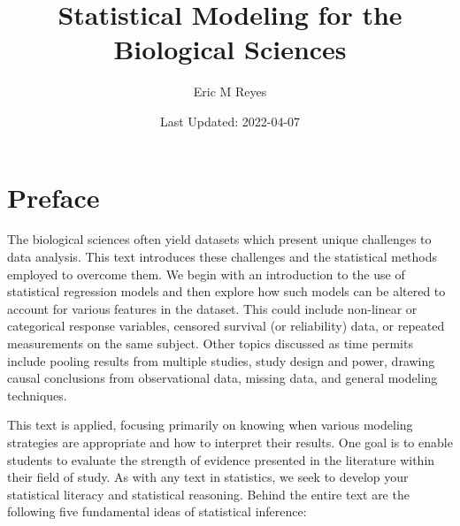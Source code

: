 \documentclass[
]{book}
\title{Statistical Modeling for the Biological Sciences}
\author{Eric M Reyes}
\date{Last Updated: 2022-04-07}
\theoremstyle{plain}
\theoremstyle{mydefn}
\theoremstyle{myexmpl}
\theoremstyle{remark}
\begin{document}
\maketitle

{
\setcounter{tocdepth}{1}
\tableofcontents
}
\newcommand{\norm}[1]{\lVert#1\rVert}
\newcommand{\abs}[1]{\lvert#1\rvert}
\newcommand{\iid}{\stackrel{\text{IID}}{\sim}}
\newcommand{\ind}{\stackrel{\text{Ind}}{\sim}}

\newcommand{\bm}[1]{\mathbf{#1}}
\newcommand{\bs}[1]{\boldsymbol{#1}}
\newcommand{\bbeta}{\bs{\beta}}

\newcommand{\Ell}{\mathcal{L}}

\hypertarget{preface}{%
\chapter*{Preface}\label{preface}}

The biological sciences often yield datasets which present unique challenges to data analysis. This text introduces these challenges and the statistical methods employed to overcome them. We begin with an introduction to the use of statistical regression models and then explore how such models can be altered to account for various features in the dataset. This could include non-linear or categorical response variables, censored survival (or reliability) data, or repeated measurements on the same subject. Other topics discussed as time permits include pooling results from multiple studies, study design and power, drawing causal conclusions from observational data, missing data, and general modeling techniques.

This text is applied, focusing primarily on knowing when various modeling strategies are appropriate and how to interpret their results. One goal is to enable students to evaluate the strength of evidence presented in the literature within their field of study. As with any text in statistics, we seek to develop your statistical literacy and statistical reasoning. Behind the entire text are the following five fundamental ideas of statistical inference:
\end{document}
